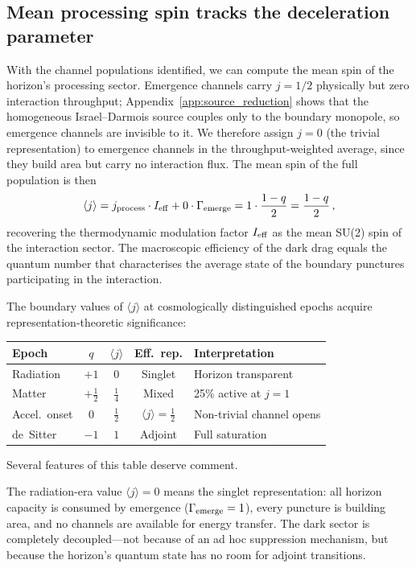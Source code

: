 \documentclass[aps,prd,twocolumn,10pt,superscriptaddress,nofootinbib]{revtex4-2}
\begin{document}
\subsection{Mean processing spin tracks the deceleration parameter}
\label{sec:mean_spin}

With the channel populations identified, we can compute the mean
spin of the horizon's processing sector.  Emergence channels
carry $j = 1/2$ physically but zero interaction throughput;
Appendix~\ref{app:source_reduction} shows that the homogeneous
Israel--Darmois source couples only to the boundary monopole,
so emergence channels are invisible to it.  We therefore assign
$j = 0$ (the trivial representation) to
emergence channels in the throughput-weighted average, since they build area but carry no interaction
flux.  The mean spin of the full population is then
\begin{equation}
\langle j \rangle
  = j_{\rm process}\cdot I_{\rm eff}
    + 0 \cdot \Gamma_{\rm emerge}
  = 1 \cdot \frac{1-q}{2}
  = \frac{1-q}{2}\,,
\label{eq:mean_j}
\end{equation}
recovering the thermodynamic modulation factor $I_{\rm eff}$ as
the mean SU(2) spin of the interaction sector.  The macroscopic
efficiency of the dark drag equals the quantum number that
characterises the average state of the boundary punctures
participating in the interaction.

The boundary values of $\langle j \rangle$ at cosmologically
distinguished epochs acquire representation-theoretic significance:

\begin{center}
\small
\begin{tabular}{lcccp{3.2cm}}
\toprule
Epoch & $q$ & $\langle j\rangle$ & Eff.\ rep. &
  Interpretation \\
\midrule
Radiation & $+1$ & $0$ & Singlet &
  Horizon transparent \\
Matter & $+\tfrac{1}{2}$ & $\tfrac{1}{4}$ &
  Mixed &
  25\% active at $j\!=\!1$ \\
Accel.\ onset & $0$ & $\tfrac{1}{2}$ & $\langle j\rangle\!=\!\tfrac{1}{2}$ &
  Non-trivial channel opens \\
de~Sitter & $-1$ & $1$ & Adjoint &
  Full saturation \\
\bottomrule
\end{tabular}
\end{center}

Several features of this table deserve comment.

The radiation-era value $\langle j \rangle = 0$ means the singlet
representation: all horizon capacity is consumed by emergence
($\Gamma_{\rm emerge} = 1$), every puncture is building area, and
no channels are available for energy transfer.  The dark sector is
completely decoupled---not because of an ad hoc suppression
mechanism, but because the horizon's quantum state has no room
for adjoint transitions.
\end{document}
